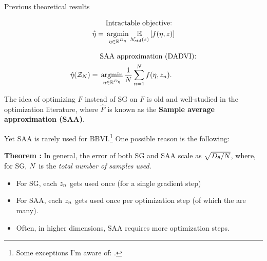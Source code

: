

\begin{frame}[t]{Previous theoretical results}
    \vspace{-3em}
    \begin{minipage}[t]{0.48\textwidth}
        \begin{align*}
            &\text{Intractable objective:} 
            \\ \etastar %
                ={}& 
                \argmin_{\eta \in \etadom} \expect{\normz}{f(\eta, \z)}
        \end{align*}    
    \end{minipage}
    \begin{minipage}[t]{0.48\textwidth}
        \begin{align*}
            &\text{SAA approximation (DADVI):} 
            \\ \etahat(\Z) %
                ={}&  \argmin_{\eta \in \etadom} \meann f(\eta, \z_n).
        \end{align*}
    \end{minipage}
    
    \hrulefill
    
    The idea of optimizing $\hat{F}$ instead of SG on $F$ is old and
    well-studied in the optimization literature, where $\hat{F}$
    is known as the \textbf{Sample average approximation (SAA)}.
    
    Yet SAA is rarely used for BBVI.\footnote{Some exceptions I'm aware of:
    \citet{giordano:2018:covariances,giordano:2022:bnp,wycoff:2022:sparsebayesianlasso,burroni:2023:saabbvi}.}
    One possible reason is the following:
    
    
    \noindent
    \textbf{Theorem \citep{nemirovski:2009:sgdvsfixed}:}
    In general, the error of both SG and SAA scale as
    $\sqrt{{D_{\theta}} / N}$,
    where, for SG, $N$ is the \textit{total number of samples used}.
    
    \pause
    \begin{itemize}
    \item For SG, each $z_n$ gets used once (for a single gradient step)
    \item For SAA, each $z_n$ gets used once per optimization step
    (of which the are many).
    \item Often, in higher dimensions, SAA requires more optimization steps.
    \end{itemize}
    

\end{frame}
